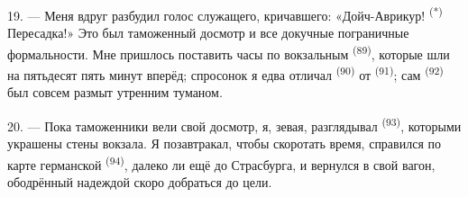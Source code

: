 \VUsaut{3.0mm}
\VUsaut{3.0mm}

19. --- Меня вдруг разбудил голос служащего, кричавшего:
«Дойч-Аврикур! \textsuperscript{(*)} Пересадка!» Это был таможенный досмотр и все
докучные пограничные формальности. Мне пришлось поставить часы по
вокзальным  \textsuperscript{(89)}, которые шли на пятьдесят пять
минут вперёд; спросонок я едва отличал 
\textsuperscript{(90)} от  \textsuperscript{(91)}; сам
 \textsuperscript{(92)} был совсем размыт утренним туманом.

20. --- Пока таможенники вели свой досмотр, я, зевая, разглядывал
 \textsuperscript{(93)}, которыми украшены стены вокзала. Я
позавтракал, чтобы скоротать время, справился по карте германской
 \textsuperscript{(94)}, далеко ли ещё до Страсбурга, и вернулся в
свой вагон, ободрённый надеждой скоро добраться до цели.
\VUsaut{6.0mm}
\VUfilet{22mm}
